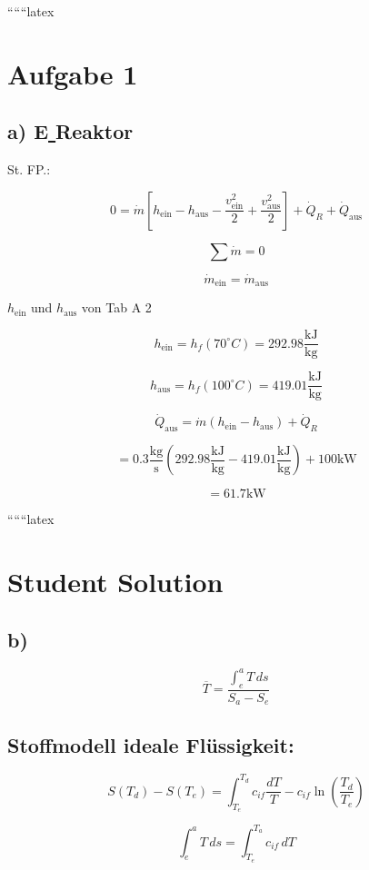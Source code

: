 
``````latex


\section*{Aufgabe 1}

\subsection*{a) E\underline{ } Reaktor}

St. FP.:

\[
0 = \dot{m} \left[ h_{\text{ein}} - h_{\text{aus}} - \frac{v^2_{\text{ein}}}{2} + \frac{v^2_{\text{aus}}}{2} \right] + \dot{Q}_R + \dot{Q}_{\text{aus}}
\]

\[
\sum \dot{m} = 0
\]

\[
\dot{m}_{\text{ein}} = \dot{m}_{\text{aus}}
\]

\noindent
$h_{\text{ein}}$ und $h_{\text{aus}}$ von Tab A 2

\[
h_{\text{ein}} = h_f(70^\circ C) = 292.98 \frac{\text{kJ}}{\text{kg}}
\]

\[
h_{\text{aus}} = h_f(100^\circ C) = 419.01 \frac{\text{kJ}}{\text{kg}}
\]

\[
\dot{Q}_{\text{aus}} = \dot{m} \left( h_{\text{ein}} - h_{\text{aus}} \right) + \dot{Q}_R
\]

\[
= 0.3 \frac{\text{kg}}{\text{s}} \left( 292.98 \frac{\text{kJ}}{\text{kg}} - 419.01 \frac{\text{kJ}}{\text{kg}} \right) + 100 \text{kW}
\]

\[
= 61.7 \text{kW}
\]

``````latex

\section*{Student Solution}

\subsection*{b)}
\[
\overline{T} = \frac{\int_{e}^{a} T \, ds}{S_a - S_e}
\]

\subsection*{Stoffmodell ideale Flüssigkeit:}
\[
S(T_d) - S(T_e) = \int_{T_e}^{T_d} c_{if} \frac{dT}{T} - c_{if} \ln \left( \frac{T_d}{T_e} \right)
\]

\[
\int_{e}^{a} T \, ds = \int_{T_e}^{T_a} c_{if} \, dT
\]

